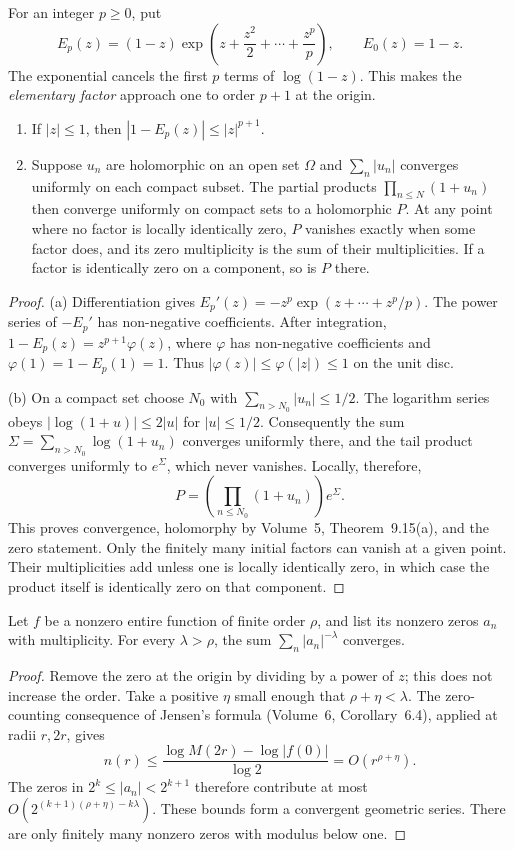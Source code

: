 For an integer $p\ge0$, put
\[E_p(z)=(1-z)\exp\left(z+\frac{z^2}2+\cdots+\frac{z^p}p\right),\qquad E_0(z)=1-z.\]
The exponential cancels the first $p$ terms of $\log(1-z)$. This makes the \emph{elementary factor} approach one to order $p+1$ at the origin.

\begin{lemma}\label{lem:products}
\begin{enumerate}
\item[(a)] If $|z|\le1$, then $|1-E_p(z)|\le|z|^{p+1}$.
\item[(b)] Suppose $u_n$ are holomorphic on an open set $\Omega$ and $\sum_n|u_n|$ converges uniformly on each compact subset. The partial products $\prod_{n\le N}(1+u_n)$ then converge uniformly on compact sets to a holomorphic $P$. At any point where no factor is locally identically zero, $P$ vanishes exactly when some factor does, and its zero multiplicity is the sum of their multiplicities. If a factor is identically zero on a component, so is $P$ there.
\end{enumerate}
\end{lemma}
\begin{proof}
(a) Differentiation gives $E_p'(z)=-z^p\exp(z+\cdots+z^p/p)$. The power series of $-E_p'$ has non-negative coefficients. After integration, $1-E_p(z)=z^{p+1}\varphi(z)$, where $\varphi$ has non-negative coefficients and $\varphi(1)=1-E_p(1)=1$. Thus $|\varphi(z)|\le\varphi(|z|)\le1$ on the unit disc.

(b) On a compact set choose $N_0$ with $\sum_{n>N_0}|u_n|\le1/2$. The logarithm series obeys $|\log(1+u)|\le2|u|$ for $|u|\le1/2$. Consequently the sum $\Sigma=\sum_{n>N_0}\log(1+u_n)$ converges uniformly there, and the tail product converges uniformly to $e^\Sigma$, which never vanishes. Locally, therefore,
\[P=\left(\prod_{n\le N_0}(1+u_n)\right)e^\Sigma.\]
This proves convergence, holomorphy by Volume~5, Theorem~9.15(a), and the zero statement. Only the finitely many initial factors can vanish at a given point. Their multiplicities add unless one is locally identically zero, in which case the product itself is identically zero on that component.
\end{proof}

\begin{lemma}\label{lem:zerocount}
Let $f$ be a nonzero entire function of finite order $\rho$, and list its nonzero zeros $a_n$ with multiplicity. For every $\lambda>\rho$, the sum $\sum_n|a_n|^{-\lambda}$ converges.
\end{lemma}
\begin{proof}
Remove the zero at the origin by dividing by a power of $z$; this does not increase the order. Take a positive $\eta$ small enough that $\rho+\eta<\lambda$. The zero-counting consequence of Jensen's formula (Volume~6, Corollary~6.4), applied at radii $r,2r$, gives
\[n(r)\le\frac{\log M(2r)-\log|f(0)|}{\log2}=O(r^{\rho+\eta}).\]
The zeros in $2^k\le|a_n|<2^{k+1}$ therefore contribute at most $O(2^{(k+1)(\rho+\eta)-k\lambda})$. These bounds form a convergent geometric series. There are only finitely many nonzero zeros with modulus below one.
\end{proof}

